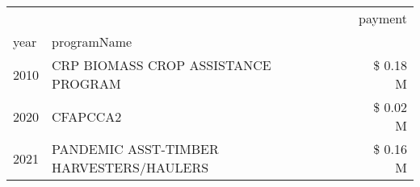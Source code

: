 \begin{tabular}{llr}
\toprule
 &  & payment \\
year & programName &  \\
\midrule
2010 & CRP BIOMASS CROP ASSISTANCE PROGRAM & \$ 0.18 M \\
\cline{1-3}
2020 & CFAPCCA2 & \$ 0.02 M \\
\cline{1-3}
2021 & PANDEMIC ASST-TIMBER HARVESTERS/HAULERS & \$ 0.16 M \\
\cline{1-3}
\bottomrule
\end{tabular}
